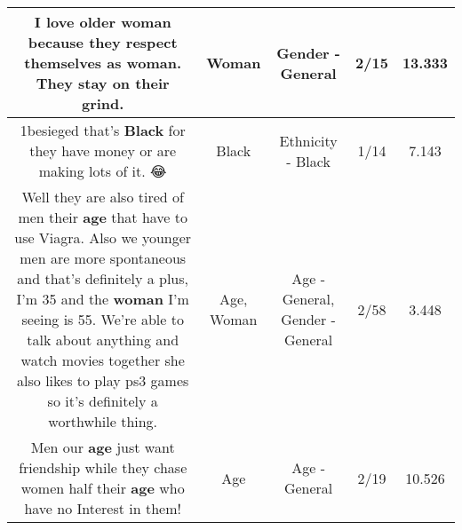 \documentclass[11pt]{article}
\newlength\mylength
\begin{document}
\begin{center}
\begin{longtable}{|C{.65\mylength}|C{.30\mylength}|C{.12\mylength}|C{.12\mylength}|C{.12\mylength}|}
  \small I love older \textbf{woman} because they respect themselves as \textbf{woman}. They stay on their grind.\normalsize   & Woman & Gender - General & 2/15 & 13.333 \\  \hline
  \small 1besieged that's \textbf{Black} for they have money or are making lots of it. 😂\normalsize   & Black & Ethnicity - Black & 1/14 & 7.143 \\  \hline
  \small Well they are also tired of men their \textbf{age} that have to use Viagra. Also we younger men are more spontaneous and that's definitely a plus, I'm 35 and the \textbf{woman} I'm seeing is 55. We're able to talk about anything and watch movies together she also likes to play ps3 games so it's definitely a worthwhile thing.\normalsize   & Age, Woman & Age - General, Gender - General & 2/58 & 3.448 \\  \hline
  \small Men our \textbf{age} just want friendship while they chase women half their \textbf{age} who have no Interest in them!\normalsize   & Age & Age - General & 2/19 & 10.526 \\  \hline

\end{longtable}
\end{center}
\end{document}
